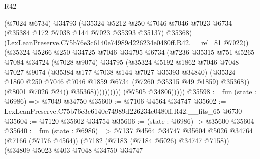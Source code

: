 \begin{lexlean}{R42}
\begin{coremodule}
{                                (@7024 @6734)
                                @34793
                                (@35324
                                  @5212
                                  @250
                                  @7046
                                  @7046
                                  @7023
                                  @6734
                                  (@35384 @172 @7038 @144 @7023 @35393 @35137)
                                  @35368)
                                (LexLeanPreserve.C75b76e3c6140e74989d226234e0480ff.R42.__rel_81
                                  @7022))
                              (@35324
                                @5266
                                @250
                                @34725
                                @7046
                                @34795
                                @6734
                                (@7236
                                  @35315
                                  @751
                                  @5265
                                  @7084
                                  @34724
                                  (@7028 @9074)
                                  @34795
                                  (@35324
                                    @5192
                                    @1862
                                    @7046
                                    @7048
                                    @7027
                                    @9074
                                    (@35384 @177 @7038 @144 @7027 @35393 @34840)
                                    (@35324
                                      @1860
                                      @250
                                      @7046
                                      @7046
                                      @1859
                                      @6734
                                      (@7260 @35315 @49 @1859)
                                      @35368))
                                  (@8001 @7026 @24))
                                @35368))))))))))
            (@7505 @34806)))))
@35598 := fun (state : @6986) => @7049 @34750
@35600 := @7106 @4564 @34747
@35602 := LexLeanPreserve.C75b76e3c6140e74989d226234e0480ff.R42.__fits_65 @6730
@35604 := @7120 @35602 @34754
@35606 := (state : @6986) -> @35600 @35604
@35640 := fun (state : @6986) =>
  @7137
    @4564
    @34747
    @35604
    @5026
    @34764
    (@7166 (@7176 @4564))
    (@7182 (@7183 (@7184 @5026) @34747 @7158))
    (@34809
      @5023
      @403
      @7048
      @34750
      @34747
}
\end{coremodule}
\end{lexlean}
